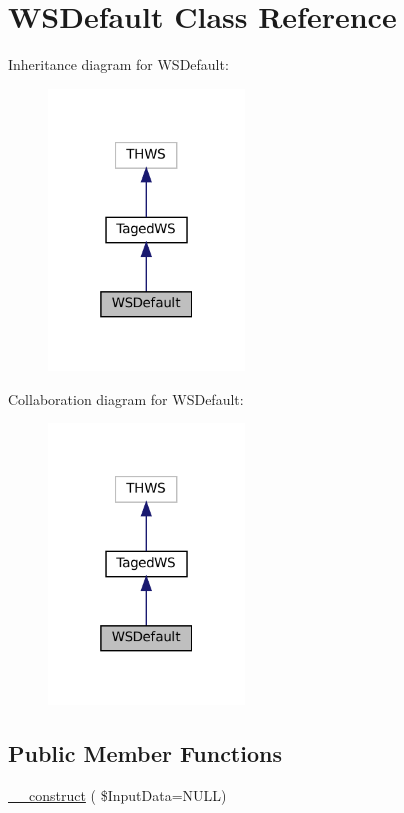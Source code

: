 \hypertarget{class_w_s_default}{}\section{W\+S\+Default Class Reference}
\label{class_w_s_default}


Inheritance diagram for W\+S\+Default\+:\nopagebreak
\begin{figure}[H]
\begin{center}
\leavevmode
\includegraphics[width=148pt]{class_w_s_default__inherit__graph}
\end{center}
\end{figure}


Collaboration diagram for W\+S\+Default\+:\nopagebreak
\begin{figure}[H]
\begin{center}
\leavevmode
\includegraphics[width=148pt]{class_w_s_default__coll__graph}
\end{center}
\end{figure}
\subsection*{Public Member Functions}
\begin{DoxyCompactItemize}
\item 
\hyperlink{class_w_s_default_aab0e0032ba89c701b9625c472ed86062}{\+\_\+\+\_\+construct} ( \$Input\+Data=N\+U\+LL)
\end{DoxyCompactItemize}
